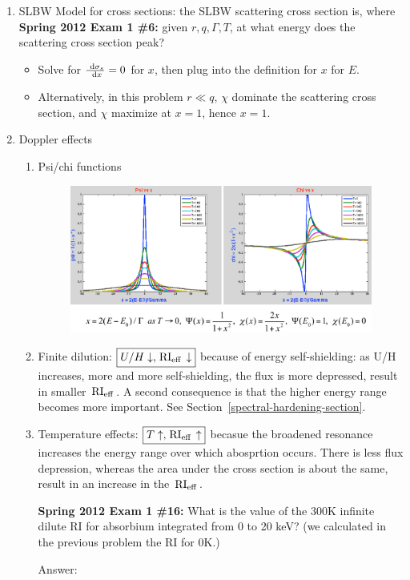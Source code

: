 \documentclass{school-22.211-notes}
\begin{document}
\clearpage
{} 
\begin{enumerate}
\item SLBW Model for cross sections: the SLBW scattering cross section is, 
  where 
  \textbf{Spring 2012 Exam 1 \#6:} given $r,q, \Gamma,T$, at what energy does the scattering cross section peak? 
  \begin{itemize}
  \item Solve for $\frac{\mbox{ }\mathrm{d} \sigma_s}{\mbox{ }\mathrm{d} x} = 0$ for $x$, then plug into the definition for $x$ for $E$.
  \item Alternatively, in this problem $r \ll q$, $\chi$ dominate the scattering cross section, and $\chi$ maximize at $x=1$, hence $x=1$. 
  \end{itemize}

\item Doppler effects
  \begin{enumerate}
    \item Psi/chi functions

      \begin{figure}[ht]
        \centering
        \includegraphics[width=6in]{images/r-m/psi-chi-plot.png}
      \end{figure}

    \item Finite dilution: $\boxed{U/H \downarrow, \left. \mathrm{RI}_{\mathrm{eff}} \right. \downarrow}$ because of energy self-shielding: as U/H increases, more and more self-shielding, the flux is more depressed, result in smaller $\left. \mathrm{RI}_{\mathrm{eff}} \right.$. A second consequence is that the higher energy range becomes more important. See Section~\ref{spectral-hardening-section}. 
    \item Temperature effects: $\boxed{T \uparrow, \left. \mathrm{RI}_{\mathrm{eff}} \right. \uparrow}$ becasue the broadened resonance increases the energy range over which abosprtion occurs. There is less flux depression, whereas the area under the cross section is about the same, result in an increase in the $\left. \mathrm{RI}_{\mathrm{eff}} \right.$. 

\textbf{Spring 2012 Exam 1 \#16:} What is the value of the 300K infinite dilute RI for absorbium integrated from 0 to 20 keV? (we calculated in the previous problem the RI for 0K.)

Answer: 
  \end{enumerate}
\end{enumerate}
\end{document}
